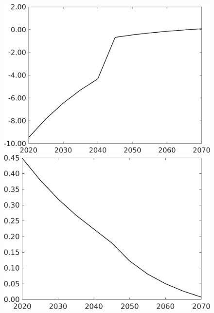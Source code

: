 \documentclass[12pt]{article}
\begin{document}
\begin{figure}[h!!]
\begin{minipage}[]{0.32\textwidth}
	\end{minipage}		
	\begin{minipage}[]{0.32\textwidth}
		\includegraphics[width=1\textwidth]{../../codding_model/own_basedOnFried/optimalPol_010922_revision/figures/all_13Sept22/CompTaufPER_bytaul_Reg0_gAg_spillover0_nsk1_xgr0_knspil0_sep0_LFlimit1_emsbase0_countec0_GovRev0_etaa0.79_lgd0.png}
	\end{minipage}
	\begin{minipage}[]{0.32\textwidth}
		\includegraphics[width=1\textwidth]{../../codding_model/own_basedOnFried/optimalPol_010922_revision/figures/all_13Sept22/CompTaufPER_bytaul_Reg0_gAn_spillover0_nsk1_xgr0_knspil0_sep0_LFlimit1_emsbase0_countec0_GovRev0_etaa0.79_lgd0.png}

\end{minipage}
\end{figure}
\end{document}

